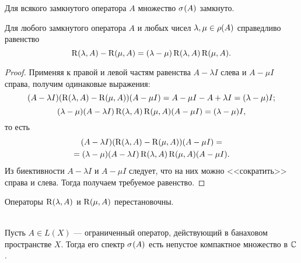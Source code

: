 \begin{corollaryth}
    Для всякого замкнутого оператора $A$ множество $\spectrum{A}$ замкнуто.
\end{corollaryth}

\begin{theorem}
    Для любого замкнутого оператора $A$ и любых чисел $\lambda, \mu \in \operatorname{\rho}(A)$ 
    справедливо равенство
    \[ \operatorname{R}(\lambda, A) - \operatorname{R}(\mu, A) 
        = (\lambda - \mu) \operatorname{R}(\lambda, A)\operatorname{R}(\mu, A). \]
\end{theorem}

\begin{proof}
    Применяя к правой и левой частям равенства $A - \lambda I$ слева и $A - \mu I$ справа, получим
    одинаковые выражения:
    \[ (A - \lambda I)(\operatorname{R}(\lambda, A) - \operatorname{R}(\mu, A))(A - \mu I) = 
    A - \mu I - A + \lambda I = (\lambda - \mu) I; \]
    \[ (\lambda - \mu)(A - \lambda I)\operatorname{R}(\lambda, A)\operatorname{R}(\mu, A)(A - \mu I) = 
    (\lambda - \mu) I, \]
    то есть
    \begin{multline*}
        (A - \lambda I)(\operatorname{R}(\lambda, A) - \operatorname{R}(\mu, A))(A - \mu I) =\\=
          (\lambda - \mu)(A - \lambda I)\operatorname{R}(\lambda, A)\operatorname{R}(\mu, A)(A - \mu I).
    \end{multline*} 
    Из биективности $A - \lambda I$ и $A - \mu I$ следует, что на них можно <<сократить>>
    справа и слева. Тогда получаем требуемое равенство.
\end{proof}

\begin{corollaryth}
    Операторы $\operatorname{R}(\lambda, A)$ и $\operatorname{R}(\mu, A)$ перестановочны.
\end{corollaryth}

\begin{theorem}\label{th:boundedspectrum}\hfill\\
    \indent Пусть $A \in L(X)$ --- ограниченный оператор, действующий в банаховом пространстве $X$.
    Тогда его спектр $\spectrum{A}$ есть непустое компактное множество в $\mathbb{C}$.
\end{theorem}

